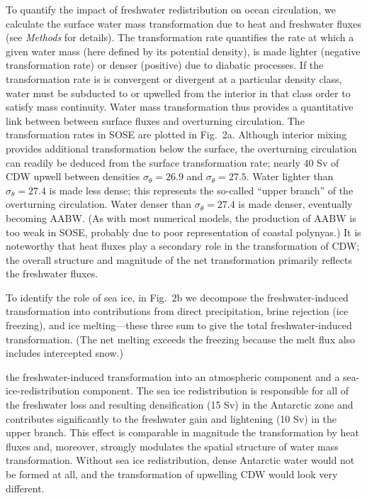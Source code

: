 \documentclass{naturemod}
\begin{document}
To quantify the impact of freshwater redistribution on ocean circulation, we calculate the surface water mass transformation due to heat and freshwater fluxes (see {\em Methods} for details). The transformation rate quantifies the rate at which a given water mass (here defined by its potential density), is made lighter (negative transformation rate) or denser (positive) due to diabatic processes. If the transformation rate is is convergent or divergent at a particular density class, water must be subducted to or upwelled from the interior in that class order to satisfy mass continuity\cite{MarshallEtAl1999,LargeNurser2001}. Water mass transformation thus provides a quantitative link between between surface fluxes and overturning circulation. The transformation rates in SOSE are plotted in Fig.~2a. Although interior mixing provides additional transformation below the surface, the overturning circulation can readily be deduced from the surface transformation rate; nearly 40 Sv of CDW upwell between densities $\sigma_\theta =  26.9$ and $\sigma_\theta = 27.5$. Water lighter than $\sigma_\theta=27.4$ is made less dense; this represents the so-called ``upper branch'' of the overturning circulation. Water denser than $\sigma_\theta=27.4$ is made denser, eventually becoming AABW. (As with most numerical models, the production of AABW is too weak in SOSE, probably due to poor representation of coastal polynyas.) It is noteworthy that heat fluxes play a secondary role in the transformation of CDW; the overall structure and magnitude of the net transformation primarily reflects the freshwater fluxes.

To identify the role of sea ice, in Fig.~2b we decompose the freshwater-induced transformation into contributions from direct precipitation, brine rejection (ice freezing), and ice melting---these three sum to give the total freshwater-induced transformation. (The net melting exceeds the freezing because the melt flux also includes intercepted snow.)


 the freshwater-induced transformation into an atmospheric component and a sea-ice-redistribution component. The sea ice redistribution is responsible for all of the freshwater loss and resulting densification (15 Sv) in the Antarctic zone and contributes significantly to the freshwater gain and lightening (10 Sv) in the upper branch. This effect is comparable in magnitude the transformation by heat fluxes and, moreover, strongly modulates the spatial structure of water mass transformation. Without sea ice redistribution, dense Antarctic water would not be formed at all, and the transformation of upwelling CDW would look very different.
 
\end{document}
